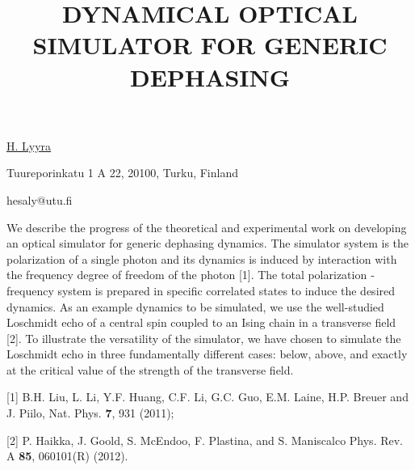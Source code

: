 \title{DYNAMICAL OPTICAL SIMULATOR FOR GENERIC DEPHASING}

\underline{H. Lyyra} 

{\normalsize{\vspace{-4mm}
Tuureporinkatu 1 A 22, 20100, Turku, Finland

\email hesaly@utu.fi}}

We describe the progress of the theoretical and experimental work on developing an optical simulator for generic dephasing dynamics. The simulator system is the polarization of a single photon and its dynamics is induced by interaction with the frequency degree of freedom of the photon [1]. The total
polarization ­frequency system is prepared in specific correlated states to induce the desired dynamics.
As an example dynamics to be simulated, we use the well-studied Loschmidt echo of a central spin
coupled to an Ising chain in a transverse field [2]. To illustrate the versatility of the simulator, we have
chosen to simulate the Loschmidt echo in three fundamentally different cases: below, above, and exactly
at the critical value of the strength of the transverse field.

{\normalsize
[1] B.­H. Liu, L. Li, Y.­F. Huang, C.­F. Li, G.­C. Guo, E.­M. Laine, H.­P. Breuer and J. Piilo, Nat. Phys. \textbf{7},
931 (2011);
\vsp

[2] P. Haikka, J. Goold, S. McEndoo, F. Plastina, and S. Maniscalco Phys. Rev. A \textbf{85}, 060101(R) (2012).
}

\vspace{\baselineskip} 